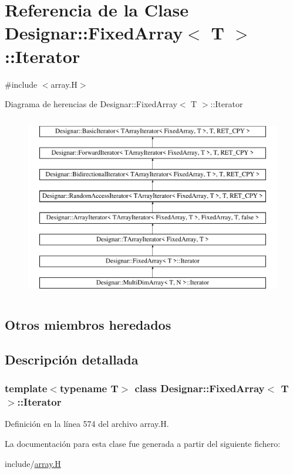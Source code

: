 \hypertarget{class_designar_1_1_fixed_array_1_1_iterator}{}\section{Referencia de la Clase Designar\+:\+:Fixed\+Array$<$ T $>$\+:\+:Iterator}
\label{class_designar_1_1_fixed_array_1_1_iterator}


{\ttfamily \#include $<$array.\+H$>$}

Diagrama de herencias de Designar\+:\+:Fixed\+Array$<$ T $>$\+:\+:Iterator\begin{figure}[H]
\begin{center}
\leavevmode
\includegraphics[height=8.000000cm]{class_designar_1_1_fixed_array_1_1_iterator}
\end{center}
\end{figure}
\subsection*{Otros miembros heredados}


\subsection{Descripción detallada}
\subsubsection*{template$<$typename T$>$\newline
class Designar\+::\+Fixed\+Array$<$ T $>$\+::\+Iterator}



Definición en la línea 574 del archivo array.\+H.



La documentación para esta clase fue generada a partir del siguiente fichero\+:\begin{DoxyCompactItemize}
\item 
include/\hyperlink{array_8_h}{array.\+H}\end{DoxyCompactItemize}

